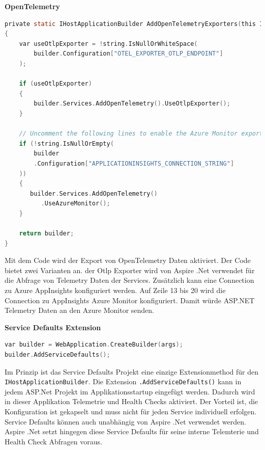             \textbf{OpenTelemetry}
            
            \begin{lstlisting}[language=C, caption=Konfiguration der Telementrie Endpoints in den Service Defaults]
private static IHostApplicationBuilder AddOpenTelemetryExporters(this IHostApplicationBuilder builder)
{
    var useOtlpExporter = !string.IsNullOrWhiteSpace(
        builder.Configuration["OTEL_EXPORTER_OTLP_ENDPOINT"]
    );

    if (useOtlpExporter)
    {
        builder.Services.AddOpenTelemetry().UseOtlpExporter();
    }

    // Uncomment the following lines to enable the Azure Monitor exporter (requires the Azure.Monitor.OpenTelemetry.AspNetCore package)
    if (!string.IsNullOrEmpty(
        builder
        .Configuration["APPLICATIONINSIGHTS_CONNECTION_STRING"]
    ))
    {
       builder.Services.AddOpenTelemetry()
          .UseAzureMonitor();
    }

    return builder;
}
            \end{lstlisting}
            Mit dem Code wird der Export von OpenTelemetry Daten aktiviert. Der Code bietet zwei Varianten an. der Otlp Exporter wird von Aspire .Net verwendet für die Abfrage von Telemetry Daten der Services. Zusätzlich kann eine Connection zu Azure AppInsights konfiguriert werden. Auf Zeile 13 bis 20 wird die Connection zu AppInsights Azure Monitor konfiguriert. Damit würde ASP.NET Telemetry Daten an den Azure Monitor senden.

            \textbf{Service Defaults Extension}
            
            \begin{lstlisting}[language=C, caption=Aktivieren der Service Defaults in einem individuellen Service]           
var builder = WebApplication.CreateBuilder(args);
builder.AddServiceDefaults();
            \end{lstlisting}
            Im Prinzip ist das Service Defaults Projekt eine einzige Extensionmethod für den \verb|IHostApplicationBuilder|. Die Extension \verb|.AddServiceDefaults()| kann in jedem ASP.Net Projekt im Applikationsstartup eingefügt werden. Dadurch wird in dieser Applikation Telemetrie und Health Checks aktiviert. Der Vorteil ist, die Konfiguration ist gekapselt und muss nicht für jeden Service individuell erfolgen. Service Defaults können auch unabhängig von Aspire .Net verwendet werden. Aspire .Net setzt hingegen diese Service Defaults für seine interne Telemterie und Health Check Abfragen voraus.

